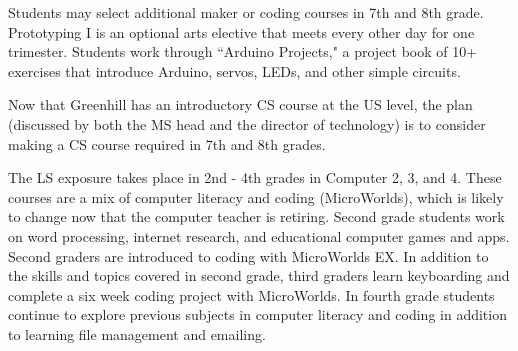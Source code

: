 Students may select additional maker or coding courses in 7th and 8th grade. Prototyping I is an optional arts elective that meets every other day for one trimester. Students work through ``Arduino Projects," a project book of 10+ exercises that introduce Arduino, servos, LEDs, and other simple circuits. \par
Now that Greenhill has an introductory CS course at the US level, the plan (discussed by both the MS head and the director of technology) is to consider making a CS course required in 7th and 8th grades. \par
The LS exposure takes place in 2nd - 4th grades in Computer 2, 3, and 4. These courses are a mix of computer literacy and coding (MicroWorlds), which is likely to change now that the computer teacher is retiring. Second grade students work on word processing, internet research, and educational computer games and apps. Second graders are introduced to coding with MicroWorlds EX. In addition to the skills and topics covered in second grade, third graders learn keyboarding and complete a six week coding project with MicroWorlds. In fourth grade students continue to explore previous subjects in computer literacy and coding in addition to learning file management and emailing. \par


